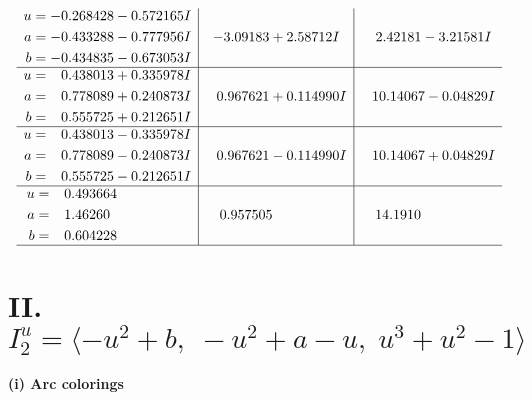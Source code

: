 \documentclass[1p]{elsarticle_modified}
\theoremstyle{definition}
\begin{document}
$$\begin{array}{c|c|c}
\begin{aligned}
u &= -0.268428 - 0.572165 I \\
a &= -0.433288 - 0.777956 I \\
b &= -0.434835 - 0.673053 I\end{aligned}
 & -3.09183 + 2.58712 I & \phantom{-}2.42181 - 3.21581 I \\ \hline\begin{aligned}
u &= \phantom{-}0.438013 + 0.335978 I \\
a &= \phantom{-}0.778089 + 0.240873 I \\
b &= \phantom{-}0.555725 + 0.212651 I\end{aligned}
 & \phantom{-}0.967621 + 0.114990 I & \phantom{-}10.14067 - 0.04829 I \\ \hline\begin{aligned}
u &= \phantom{-}0.438013 - 0.335978 I \\
a &= \phantom{-}0.778089 - 0.240873 I \\
b &= \phantom{-}0.555725 - 0.212651 I\end{aligned}
 & \phantom{-}0.967621 - 0.114990 I & \phantom{-}10.14067 + 0.04829 I \\ \hline\begin{aligned}
u &= \phantom{-}0.493664\phantom{ +0.000000I} \\
a &= \phantom{-}1.46260\phantom{ +0.000000I} \\
b &= \phantom{-}0.604228\phantom{ +0.000000I}\end{aligned}
 & \phantom{-}0.957505\phantom{ +0.000000I} & \phantom{-}14.1910\phantom{ +0.000000I}\\
 \hline 
 \end{array}$$\newpage\newpage\renewcommand{\arraystretch}{1}
\centering \section*{II. $I^u_{2}= \langle - u^2+b,\;- u^2+a- u,\;u^3+u^2-1 \rangle$}
\flushleft \textbf{(i) Arc colorings}\\
\end{document}
